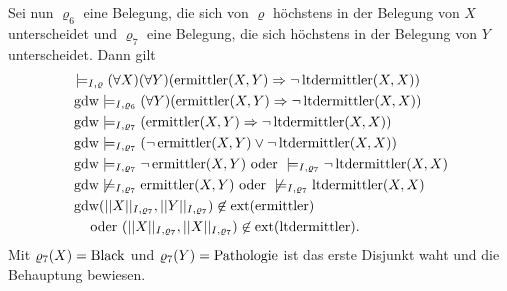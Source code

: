 \documentclass[12pt,a4paper]{amsart}
\begin{document}
\medskip

Sei nun $\varrho_6$ eine Belegung, die sich von $\varrho$ höchstens in der Belegung von $X$ unterscheidet und $\varrho_7$ eine Belegung, die sich höchstens
in der Belegung von $Y$ unterscheidet. Dann gilt
\begin{align*}
&\models_{I,\varrho} (\forall X)(\forall Y)(\operatorname{ermittler}(X,Y)\Rightarrow\lnot\operatorname{ltdermittler}(X,X))\\
&\operatorname{gdw} \models_{I,\varrho_6} (\forall Y)(\operatorname{ermittler}(X,Y)\Rightarrow\lnot\operatorname{ltdermittler}(X,X))\\
&\operatorname{gdw} \models_{I,\varrho_7} (\operatorname{ermittler}(X,Y)\Rightarrow\lnot\operatorname{ltdermittler}(X,X))\\
&\operatorname{gdw} \models_{I,\varrho_7} (\lnot \operatorname{ermittler}(X,Y)\lor\lnot\operatorname{ltdermittler}(X,X))\\
&\operatorname{gdw} \models_{I,\varrho_7} \lnot\operatorname{ermittler}(X,Y)\mbox{ oder } \models_{I,\varrho_7}\lnot\operatorname{ltdermittler}(X,X)\\
&\operatorname{gdw} \not \models_{I,\varrho_7} \operatorname{ermittler}(X,Y)\mbox{ oder } \not \models_{I,\varrho_7}\operatorname{ltdermittler}(X,X)\\
&\operatorname{gdw} (||X||_{I,\varrho_7},||Y||_{I,\varrho_7})\not\in\operatorname{ext}(\operatorname{ermittler})\\
&\quad\mbox{ oder } (||X||_{I,\varrho_7},||X||_{I,\varrho_7})\not\in\operatorname{ext}(\operatorname{ltdermittler}).
\end{align*}
Mit $\varrho_7(X)=\operatorname{Black}$ und $\varrho_7(Y)=\operatorname{Pathologie}$ ist das erste Disjunkt waht und die Behauptung bewiesen.

\medskip
\end{document}
